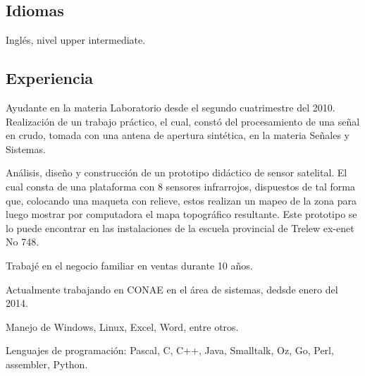 \documentclass[a4paper,10pt]{article}
\begin{document}
\subsection*{Idiomas}
    Inglés, nivel upper intermediate.

\subsection*{Experiencia}
Ayudante en la materia Laboratorio desde el segundo cuatrimestre del 2010.
Realización de un trabajo práctico, el cual, constó del procesamiento de una 
señal en crudo, tomada con una antena de apertura sintética, en la materia 
Señales y Sistemas.

Análisis, diseño y construcción de un prototipo didáctico de sensor satelital. 
El cual consta de una plataforma con 8 sensores infrarrojos, dispuestos de tal 
forma que, colocando una maqueta con relieve, estos realizan un mapeo de la 
zona para luego mostrar por computadora el mapa topográfico resultante. Este 
prototipo se lo puede encontrar en las instalaciones de la escuela provincial 
de Trelew ex-enet No 748.

Trabajé en el negocio familiar en ventas durante 10 años.

Actualmente trabajando en CONAE en el área de sistemas, dedsde enero del 2014.

Manejo de Windows, Linux, Excel, Word, entre otros.

Lenguajes de programación: Pascal, C, C++, Java, Smalltalk, Oz, Go, Perl,
assembler, Python.

\newpage
\end{document}
